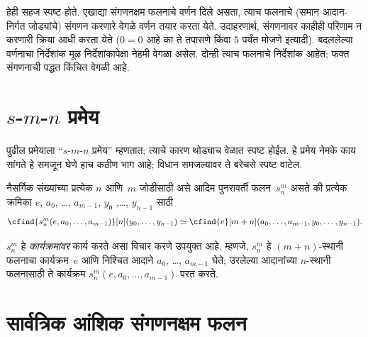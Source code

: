 हेही सहज स्पष्ट होते. एखाद्या संगणनक्षम फलनाचे वर्णन दिले असता,
त्याच फलनाचे (समान आदान-निर्गत जोड्यांचे) संगणन करणारे वेगळे वर्णन
तयार करता येते. उदाहरणार्थ, संगणनावर काहीही परिणाम न करणारी क्रिया
आधी करता येते ($0 = 0$ आहे का ते तपासणे किंवा $5$ पर्यंत मोजणे इत्यादी).
बदललेल्या वर्णनाचा निर्देशांक मूळ निर्देशांकापेक्षा नेहमी वेगळा असेल.
दोन्ही त्याच फलनाचे निर्देशांक आहेत; फक्त संगणनाची पद्धत किंचित वेगळी आहे.











\section{$s$-$m$-$n$ प्रमेय}\label{cmp:thy:smn:sec}

\begin{explain}
पुढील प्रमेयाला ``$s$-$m$-$n$ प्रमेय'' म्हणतात; त्याचे कारण थोड्याच
वेळात स्पष्ट होईल. हे प्रमेय नेमके काय सांगते हे समजून घेणे हाच कठीण
भाग आहे; विधान समजल्यावर ते बरेचसे स्पष्ट वाटेल.
\end{explain}

\begin{thm}
\label{cmp:thy:smn:thm:s-m-n}
  नैसर्गिक संख्यांच्या प्रत्येक $n$ आणि~$m$ जोडीसाठी असे आदिम
  पुनरावर्ती फलन~$s^m_n$ असते की प्रत्येक क्रमिका
  $e$, $a_0$, \dots, $a_{m-1}$, $y_0$ ,\dots, $y_{n-1}$ साठी
  \[  \cfind{s^m_n(e, a_0, \dots, a_{m-1})}[n](y_0, \dots, y_{n-1}) \simeq
  \cfind{e}[m+n](a_0, \dots, a_{m-1}, y_0, \dots, y_{n-1}).
\]
\end{thm}

\begin{explain}
$s^m_n$ हे \emph{कार्यक्रमांवर} कार्य करते असा विचार करणे उपयुक्त आहे.
म्हणजे, $s^m_n$ हे $(m+n)$-स्थानी फलनाचा कार्यक्रम~$e$ आणि निश्चित
आदाने $a_0$, \dots, $a_{m-1}$ घेते; उरलेल्या आदानांच्या $n$-स्थानी
फलनासाठी ते कार्यक्रम
$s^m_n(e, a_0, \dots, a_{m-1})$ परत करते.


\end{explain}











\section{सार्वत्रिक आंशिक संगणनक्षम फलन}\label{cmp:thy:uni:sec}

